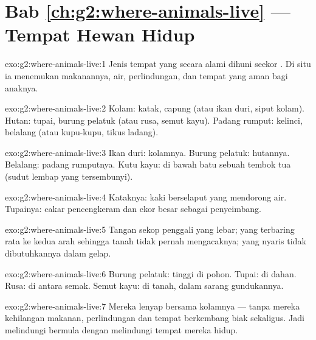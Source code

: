 \section*{Bab \ref{ch:g2:where-animals-live} --- Tempat Hewan Hidup}

\begin{solution}{exo:g2:where-animals-live:1}
Jenis tempat yang secara alami dihuni seekor . Di situ ia
menemukan makanannya, air, perlindungan, dan tempat yang aman bagi
anaknya.
\end{solution}

\begin{solution}{exo:g2:where-animals-live:2}
Kolam: katak, capung (atau ikan duri, siput kolam). Hutan: tupai,
burung pelatuk (atau rusa, semut kayu). Padang rumput: kelinci,
belalang (atau kupu-kupu, tikus ladang).
\end{solution}

\begin{solution}{exo:g2:where-animals-live:3}
Ikan duri: kolamnya. Burung pelatuk: hutannya. Belalang: padang
rumputnya. Kutu kayu: di bawah batu sebuah tembok tua (sudut lembap
yang tersembunyi).
\end{solution}

\begin{solution}{exo:g2:where-animals-live:4}
Kataknya: kaki berselaput yang mendorong air. Tupainya: cakar
pencengkeram dan ekor besar sebagai penyeimbang.
\end{solution}

\begin{solution}{exo:g2:where-animals-live:5}
Tangan sekop penggali yang lebar;  yang terbaring rata ke kedua
arah sehingga tanah tidak pernah mengacaknya;  yang nyaris tidak
dibutuhkannya dalam gelap.
\end{solution}

\begin{solution}{exo:g2:where-animals-live:6}
Burung pelatuk: tinggi di  pohon. Tupai: di dahan. Rusa: di
antara semak. Semut kayu: di tanah, dalam sarang gundukannya.
\end{solution}

\begin{solution}{exo:g2:where-animals-live:7}
Mereka lenyap bersama kolamnya --- tanpa  mereka kehilangan
makanan, perlindungan dan tempat berkembang biak sekaligus. Jadi
melindungi  bermula dengan melindungi tempat mereka hidup.
\end{solution}


